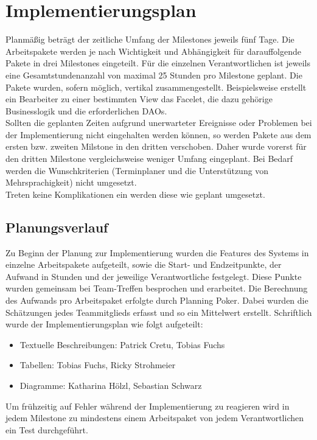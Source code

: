 \newcommand{\kursiv}[1]{{\it #1}}
\chapter{Implementierungsplan}
Planmäßig beträgt der zeitliche Umfang der Milestones jeweils fünf Tage. Die Arbeitspakete werden
je nach Wichtigkeit und Abhängigkeit für darauffolgende Pakete in drei Milestones eingeteilt. Für die einzelnen Verantwortlichen ist jeweils eine Gesamtstundenanzahl von maximal 25 Stunden pro Milestone geplant. Die Pakete wurden, sofern möglich, vertikal zusammengestellt.
Beispielsweise erstellt ein Bearbeiter zu einer bestimmten View das Facelet, die dazu
gehörige Businesslogik und die erforderlichen DAOs.\\
Sollten die geplanten Zeiten aufgrund unerwarteter Ereignisse oder Problemen bei der Implementierung nicht eingehalten werden können, so werden Pakete aus dem
ersten bzw. zweiten Milstone in den dritten verschoben. Daher wurde vorerst für den dritten Milestone vergleichsweise weniger Umfang eingeplant.
Bei Bedarf werden die Wunschkriterien (Terminplaner und die Unterstützung von Mehrsprachigkeit) nicht umgesetzt.\\
Treten keine Komplikationen ein werden diese wie geplant umgesetzt.

\section{Planungsverlauf}
Zu Beginn der Planung zur Implementierung wurden die Features des Systems in einzelne Arbeitspakete aufgeteilt, sowie die Start- und Endzeitpunkte, der Aufwand in Stunden und der jeweilige Verantwortliche festgelegt. Diese Punkte wurden gemeinsam bei Team-Treffen besprochen und erarbeitet. Die Berechnung des Aufwands pro Arbeitspaket erfolgte durch \grqq Planning Poker\grqq.  Dabei wurden die Schätzungen jedes Teammitglieds erfasst und so ein Mittelwert erstellt.
Schriftlich wurde der Implementierungsplan wie folgt aufgeteilt:

\begin{itemize}
\item Textuelle Beschreibungen: Patrick Cretu, Tobias Fuchs
\item Tabellen: Tobias Fuchs, Ricky Strohmeier
\item Diagramme: Katharina Hölzl, Sebastian Schwarz
\end{itemize} 
Um frühzeitig auf Fehler während der Implementierung zu reagieren wird in jedem Milestone zu mindestens einem Arbeitspaket von jedem Verantwortlichen ein Test durchgeführt.

